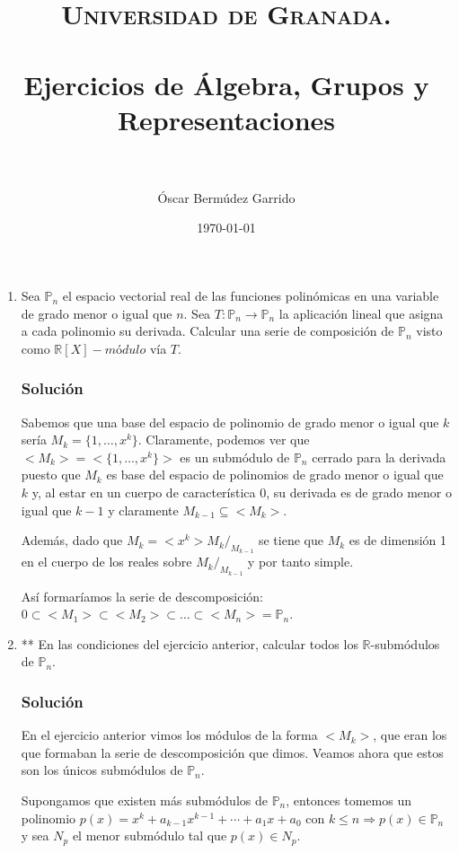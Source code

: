 \documentclass[paper=a4, fontsize=11pt, spanish]{scrartcl}
\title{
  \normalfont \normalsize 
  \textsc{Universidad de Granada.} \\ [25pt] %
  \horrule{0.5pt} \\[0.4cm] %
  \huge Ejercicios de Álgebra, Grupos y Representaciones \\ %
  \horrule{2pt} \\[0.5cm] %
}
\author{Óscar Bermúdez Garrido} %
\date{\normalsize\today} %
\begin{document}
	\maketitle %
	
	\newpage

	\begin{enumerate}
		\item Sea $\mathbb{P}_n$ el espacio vectorial real de las funciones polinómicas en una variable de grado
		menor o igual que $n$. Sea $T: \mathbb{P}_n \rightarrow \mathbb{P}_n$ la aplicación lineal que asigna a
		cada polinomio su derivada. Calcular una serie de composición de $\mathbb{P}_n$ visto como $\mathbb{R}[X]
		-módulo$ vía $T$.
		\subsubsection*{Solución}
		Sabemos que una base del espacio de polinomio de grado menor o igual que $k$ sería $M_k = \{1, \dots, x^k\}$.
		Claramente, podemos ver que $<M_k> = <\{1, \dots, x^k\}>$ es un submódulo de $\mathbb{P}_n$ cerrado para
		la derivada puesto que $M_k$ es base del espacio de polinomios de grado menor o igual que $k$ y, al estar
		en un cuerpo de característica 0, su derivada es de grado menor o igual que $k-1$ y claramente $M_{k-1}
		\subseteq <M_k>$.
		
		Además, dado que $M_k = <x^k> M_k/_{M_{k-1}}$ se tiene que $M_k$ es de dimensión 1 en el cuerpo de los
		reales sobre $M_k/_{M_{k-1}}$ y por tanto simple.
		
		Así formaríamos la serie de descomposición: $0 \subset <M_1> \subset <M_2> \subset \dots \subset <M_n> =
		\mathbb{P}_n$.
		
		\item ** En las condiciones del ejercicio anterior, calcular todos los $\mathbb{R}$-submódulos de
		$\mathbb{P}_n$.
		\subsubsection*{Solución}
		En el ejercicio anterior vimos los módulos de la forma $<M_k>$, que eran los que formaban la serie de
		descomposición que dimos. Veamos ahora que estos son los únicos submódulos de $\mathbb{P}_n$.
		
		Supongamos que existen más submódulos de $\mathbb{P}_n$, entonces tomemos un polinomio $p(x) = x^k +
		a_{k-1}x^{k-1} + \cdots + a_1x+a_0$ con $k \leq n \Rightarrow p(x) \in \mathbb{P}_n$ y sea $N_p$ el menor
		submódulo tal que $p(x) \in N_p$.
		

\end{enumerate}
\end{document}
